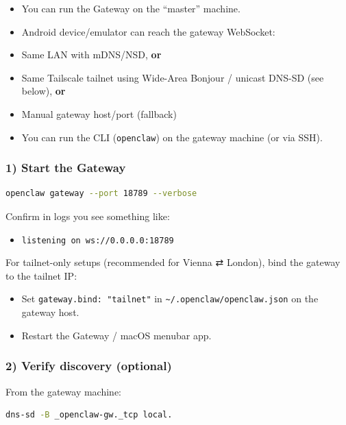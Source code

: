 \begin{itemize}
  \item You can run the Gateway on the “master” machine.
  \item Android device/emulator can reach the gateway WebSocket:
  \item Same LAN with mDNS/NSD, \textbf{or}
  \item Same Tailscale tailnet using Wide-Area Bonjour / unicast DNS-SD (see below), \textbf{or}
  \item Manual gateway host/port (fallback)
  \item You can run the CLI (\texttt{openclaw}) on the gateway machine (or via SSH).
\end{itemize}


\subsubsection{1) Start the Gateway}


\begin{lstlisting}[language=bash]
openclaw gateway --port 18789 --verbose
\end{lstlisting}


Confirm in logs you see something like:

\begin{itemize}
  \item \texttt{listening on ws://0.0.0.0:18789}
\end{itemize}


For tailnet-only setups (recommended for Vienna ⇄ London), bind the gateway to the tailnet IP:

\begin{itemize}
  \item Set \texttt{gateway.bind: "tailnet"} in \texttt{\textasciitilde{}/.openclaw/openclaw.json} on the gateway host.
  \item Restart the Gateway / macOS menubar app.
\end{itemize}


\subsubsection{2) Verify discovery (optional)}


From the gateway machine:

\begin{lstlisting}[language=bash]
dns-sd -B _openclaw-gw._tcp local.
\end{lstlisting}


